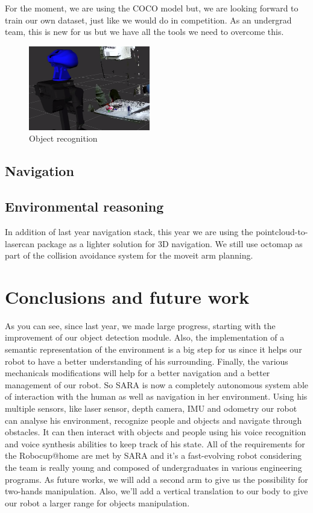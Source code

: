 \documentclass[runningheads,a4paper]{llncs}
\begin{document}
For the moment, we are using the COCO model but, we are looking forward to train our own dataset, just like we would do in competition. As an undergrad team, this is new for us but we have all the tools we need to overcome this. \\

\ifdraft
\begin{figure}
  \centering
  \includegraphics[width=150pt]{images/objectreco.png}
  \caption{Object recognition}
\end{figure}
\fi

\newpage
\subsection{Navigation}
\tab  

\subsection{Environmental reasoning}
\tab In addition of last year navigation stack, this year we are using the pointcloud-to-lasercan package as a lighter solution for 3D navigation. We still use octomap as part of the collision avoidance system for the moveit arm planning.\\



\section{Conclusions and future work}
\tab As you can see, since last year, we made large progress, starting with the improvement of our object detection module. Also, the implementation of a semantic representation of the environment is a big step for us since it helps our robot to have a better understanding of his surrounding. Finally, the various mechanicals modifications will help for a better navigation and a better management of our robot. So SARA is now a completely autonomous system able of interaction with the human as well as navigation in her environment. Using his multiple sensors, like laser sensor, depth camera, IMU and odometry our robot can analyse his environment, recognize people and objects and navigate through obstacles. It can then interact with objects and people using his voice recognition and voice synthesis abilities to keep track of his state. All of the requirements for the Robocup@home are met by SARA and it's a fast-evolving robot considering the team is really young and composed of undergraduates in various engineering programs. As future works, we will add a second arm to give us the possibility for two-hands manipulation. Also, we'll add a vertical translation to our body to give our robot a larger range for objects manipulation.\\
\end{document}
